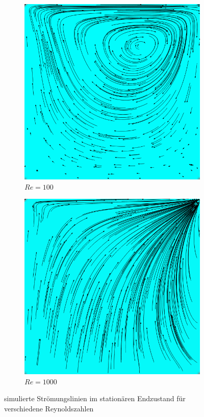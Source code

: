 \begin{figure}[!htb]
			\begin{subfigure}[b]{.5\textwidth}
				\center
				\includegraphics[scale = 0.28]{screenshots/time-3800.png}
				\caption{$Re=100$}
				\label{fig:re 100}
			\end{subfigure}
			\begin{subfigure}[b]{.5\textwidth}
				\center
				\includegraphics[scale = 0.28]{screenshots/re-1000-64.png}
				\caption{$Re=1000$}
				\label{fig:re 1000 64}
			\end{subfigure}
			\caption{simulierte Strömungslinien im stationären Endzustand für verschiedene Reynoldszahlen}
			\label{fig:steady state re}
		\end{figure}

